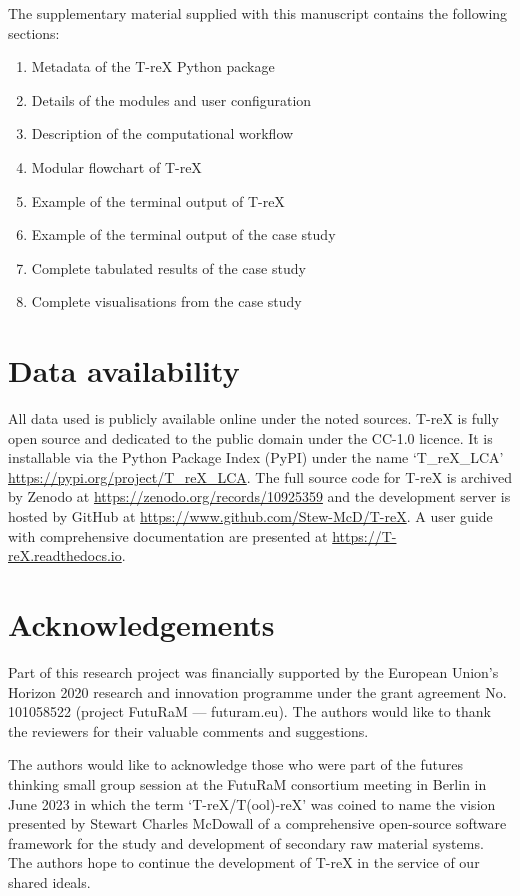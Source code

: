 \documentclass[a4paper,fleqn]{cas-dc}
\begin{document}
	\appendix
	The supplementary material supplied with this manuscript contains the
	following sections:
	\begin{enumerate}
		\item Metadata of the T-reX Python package\label{sec:supplementary-1}
		\item Details of the modules and user configuration\label{sec:supplementary-2}
		\item Description of the computational workflow\label{sec:supplementary-3}
		\item Modular flowchart of T-reX\label{sec:supplementary-4}
		\item Example of the terminal output of T-reX\label{sec:supplementary-5}
		\item Example of the terminal output of the case study\label{sec:supplementary-6}
		\item Complete tabulated results of the case study\label{sec:supplementary-7}
		\item Complete visualisations from the case study\label{sec:supplementary-8}
	\end{enumerate}
	
	\section*{Data availability}
	All data used is publicly available online under the noted sources. T-reX is fully open source and dedicated to the public domain under the CC-1.0 licence. It is installable via the Python Package Index (PyPI) under the name `T\_reX\_LCA' \url{https://pypi.org/project/T_reX_LCA}.
	The full source code for T-reX is archived by Zenodo at \url{https://zenodo.org/records/10925359} 
	and the development server is hosted by GitHub at \url{https://www.github.com/Stew-McD/T-reX}. A user guide with comprehensive documentation are presented at \url{https://T-reX.readthedocs.io}.
	
	\section*{Acknowledgements}
	Part of this research project was financially supported by the European Union's Horizon 2020 research and innovation programme under the grant agreement No. 101058522 (project FutuRaM --- futuram.eu). The authors would like to thank the reviewers for their valuable comments and suggestions.
	
	The authors would like to acknowledge those who were part of the futures
	thinking small group session at the FutuRaM consortium meeting in Berlin in
	June 2023 in which the term `T-reX/T(ool)-reX' was coined to name the vision
	presented by Stewart Charles McDowall of a comprehensive open-source software
	framework for the study and development of secondary raw material systems. The
	authors hope to continue the development of T-reX in the service of our shared
	ideals.
	
\end{document}

